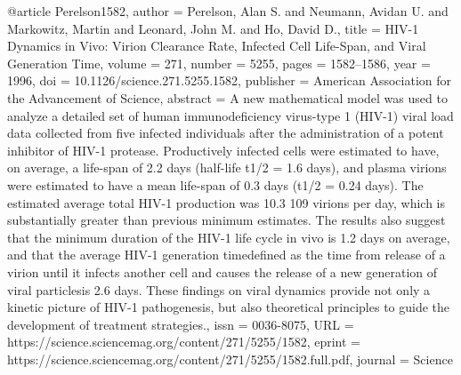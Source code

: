 @article {Perelson1582,
	author = {Perelson, Alan S. and Neumann, Avidan U. and Markowitz, Martin and 
Leonard, John M. and Ho, David D.},
	title = {HIV-1 Dynamics in Vivo: Virion Clearance Rate, Infected Cell 
Life-Span, and Viral Generation Time},
	volume = {271},
	number = {5255},
	pages = {1582--1586},
	year = {1996},
	doi = {10.1126/science.271.5255.1582},
	publisher = {American Association for the Advancement of Science},
	abstract = {A new mathematical model was used to analyze a detailed set of 
human immunodeficiency virus-type 1 (HIV-1) viral load data collected from five 
infected individuals after the administration of a potent inhibitor of HIV-1 
protease. Productively infected cells were estimated to have, on average, a 
life-span of 2.2 days (half-life t1/2 = 1.6 days), and plasma virions were 
estimated to have a mean life-span of 0.3 days (t1/2 = 0.24 days). The estimated 
average total HIV-1 production was 10.3 {\texttimes} 109 virions per day, which 
is substantially greater than previous minimum estimates. The results also 
suggest that the minimum duration of the HIV-1 life cycle in vivo is 1.2 days on 
average, and that the average HIV-1 generation time{\textemdash}defined as the 
time from release of a virion until it infects another cell and causes the 
release of a new generation of viral particles{\textemdash}is 2.6 days. These 
findings on viral dynamics provide not only a kinetic picture of HIV-1 
pathogenesis, but also theoretical principles to guide the development of 
treatment strategies.},
	issn = {0036-8075},
	URL = {https://science.sciencemag.org/content/271/5255/1582},
	eprint = {https://science.sciencemag.org/content/271/5255/1582.full.pdf},
	journal = {Science}
}

